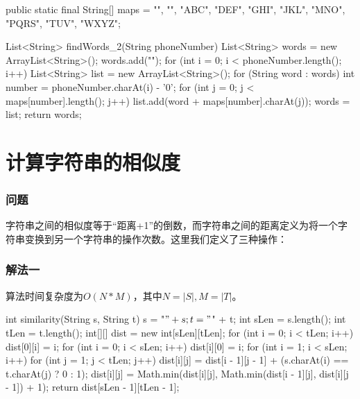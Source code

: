 \begin{Codex}[label={[$O(3^N)+O(3^N)$]Chap03_02_PhoneNumber.java}]
public static final String[] maps = {"", "", "ABC", "DEF",
									"GHI", "JKL", "MNO",
									"PQRS", "TUV", "WXYZ"};
	
List<String> findWords_2(String phoneNumber) {
	List<String> words = new ArrayList<String>();
	words.add("");
	for (int i = 0; i < phoneNumber.length(); i++) {
		List<String> list = new ArrayList<String>();
		for (String word : words) {
			int number = phoneNumber.charAt(i) - '0';
			for (int j = 0; j < maps[number].length(); j++) {
				list.add(word + maps[number].charAt(j));
			}
		}
		words = list;
	}
	return words;
}
\end{Codex}

\section{计算字符串的相似度} %
\label{sec:string-similarity}


\subsubsection{问题}
字符串之间的相似度等于“距离+1”的倒数，而字符串之间的距离定义为将一个字符串变换到另一个字符串的操作次数。这里我们定义了三种操作：

\subsubsection{解法一}
算法时间复杂度为$O(N*M)$，其中$N=|S|,M=|T|$。

\begin{Codex}[label={[$O(N*M)+O(N*M)$]Chap03_03_StringSimilarity.java}]
int similarity(String s, String t) {
	s = "$" + s;
	t = "$" + t;
	int sLen = s.length();
	int tLen = t.length();
	int[][] dist = new int[sLen][tLen];
	for (int i = 0; i < tLen; i++) {
		dist[0][i] = i;
	}
	for (int i = 0; i < sLen; i++) {
		dist[i][0] = i;
	}
	for (int i = 1; i < sLen; i++) {
		for (int j = 1; j < tLen; j++) {
			dist[i][j] = dist[i - 1][j - 1]
					+ (s.charAt(i) == t.charAt(j) ? 0 : 1);
			dist[i][j] = Math.min(dist[i][j],
					Math.min(dist[i - 1][j], dist[i][j - 1]) + 1);
		}
	}
	return dist[sLen - 1][tLen - 1];
}
\end{Codex}


